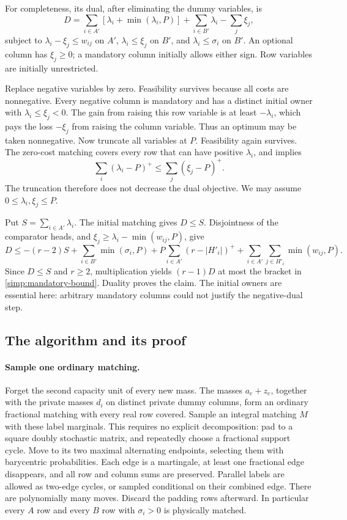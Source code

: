 For completeness, its dual, after eliminating the dummy variables, is
\[
 D=\sum_{i\in A'}[\lambda_i+\min(\lambda_i,P)]
       +\sum_{i\in B'}\lambda_i-\sum_j\xi_j,
\]
subject to $\lambda_i-\xi_j\le w_{ij}$ on $A'$,
$\lambda_i\le\xi_j$ on $B'$, and $\lambda_i\le\sigma_i$ on $B'$.
An optional column has $\xi_j\ge0$; a mandatory column initially
allows either sign.  Row variables are initially unrestricted.

Replace negative variables by zero.  Feasibility survives because
all costs are nonnegative.  Every negative column is mandatory and
has a distinct initial owner with $\lambda_i\le\xi_j<0$.
The gain from raising this row variable is at least $-\lambda_i$,
which pays the loss $-\xi_j$ from raising the column variable.
Thus an optimum may be taken nonnegative.  Now truncate all variables
at $P$.  Feasibility again survives.  The zero-cost matching covers
every row that can have positive $\lambda_i$, and implies
\[
 \sum_i(\lambda_i-P)^+\le\sum_j(\xi_j-P)^+.
\]
The truncation therefore does not decrease the dual objective.
We may assume $0\le\lambda_i,\xi_j\le P$.

Put $S=\sum_{i\in A'}\lambda_i$.  The initial matching gives $D\le S$.
Disjointness of the comparator heads, and
$\xi_j\ge\lambda_i-\min(w_{ij},P)$, give
\[
 D\le-(r-2)S+\sum_{i\in B'}\min(\sigma_i,P)
       +P\sum_{i\in A'}(r-|H'_i|)^+
       +\sum_{i\in A'}\sum_{j\in H'_i}\min(w_{ij},P).
\]
Since $D\le S$ and $r\ge2$, multiplication yields
$(r-1)D$ at most the bracket in \eqref{simp:mandatory-bound}.
Duality proves the claim.  The initial owners are essential here:
arbitrary mandatory columns could not justify the negative-dual step.

\subsection{The algorithm and its proof}

\paragraph{Sample one ordinary matching.}
Forget the second capacity unit of every new mass.  The masses
$a_e+z_e$, together with the private masses $d_i$ on distinct private
dummy columns, form an ordinary fractional matching with every real
row covered.  Sample an integral matching $M$ with these label marginals.
This requires no explicit decomposition: pad to a square doubly
stochastic matrix, and repeatedly choose a fractional support cycle.
Move to its two maximal alternating endpoints, selecting them with
barycentric probabilities.  Each edge is a martingale, at least one
fractional edge disappears, and all row and column sums are preserved.
Parallel labels are allowed as two-edge cycles, or sampled conditional
on their combined edge.  There are polynomially many moves.  Discard
the padding rows afterward.  In particular every $A$ row and every
$B$ row with $\sigma_i>0$ is physically matched.

